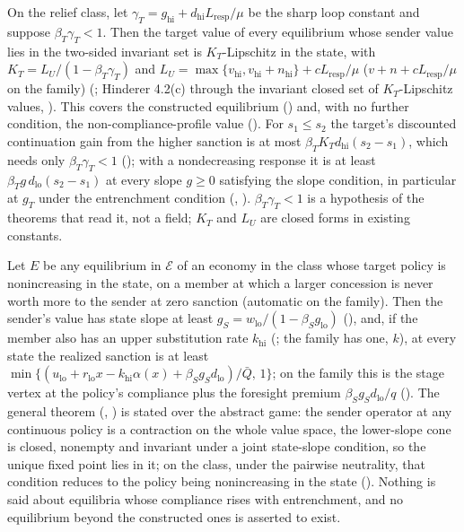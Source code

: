 \begin{proposition}
\label{prop:target-two-sided}
On the relief class, let $\gamma_T=g_{\mathrm{hi}}+d_{\mathrm{hi}}L_{\mathrm{resp}}/\mu$
be the sharp loop constant and suppose $\beta_T\gamma_T<1$. Then the target value
of every equilibrium whose sender value lies in the two-sided invariant set is
$K_T$-Lipschitz in the state, with $K_T=L_U/(1-\beta_T\gamma_T)$ and
$L_U=\max\{v_{\mathrm{hi}},v_{\mathrm{hi}}+n_{\mathrm{hi}}\}+cL_{\mathrm{resp}}/\mu$
($v+n+cL_{\mathrm{resp}}/\mu$ on the family)
(; Hinderer 4.2(c) through the
invariant closed set of $K_T$-Lipschitz values, ).
This covers the constructed equilibrium () and, with no
further condition, the non-compliance-profile value (). For $s_1\le s_2$
the target's discounted continuation gain from the higher sanction is at most
$\beta_TK_Td_{\mathrm{hi}}(s_2-s_1)$, which needs only $\beta_T\gamma_T<1$
(); with a nondecreasing response it is at least
$\beta_Tg\,d_{\mathrm{lo}}(s_2-s_1)$ at every slope $g\ge0$ satisfying the
slope condition, in particular at $g_T$ under the entrenchment condition
(, ).
$\beta_T\gamma_T<1$ is a hypothesis of the theorems that read it, not a field;
$K_T$ and $L_U$ are closed forms in existing constants.
\end{proposition}

\begin{proposition}
\label{prop:certified-equilibria}
Let $E$ be any equilibrium in $\mathcal E$ of an economy in the class whose target
policy is nonincreasing in the state, on a member at which a larger concession
is never worth more to the sender at zero sanction (automatic on the family).
Then the sender's value has state slope
at least $g_S=w_{\mathrm{lo}}/(1-\beta_Sg_{\mathrm{lo}})$ (),
and, if the member also has an upper substitution rate
$k_{\mathrm{hi}}$ (; the family has one, $k$), at every
state the realized sanction is at least
$\min\{(u_{\mathrm{lo}}+r_{\mathrm{lo}}x-k_{\mathrm{hi}}\alpha(x)+\beta_Sg_Sd_{\mathrm{lo}})/\bar Q,\,1\}$;
on the family this is the stage vertex at the policy's compliance plus the
foresight premium $\beta_Sg_Sd_{\mathrm{lo}}/q$
().
The general theorem (,
) is stated over the
abstract game: the sender operator at any continuous policy is a contraction
on the whole value space, the lower-slope cone is closed, nonempty and
invariant under a joint state-slope condition, so the unique fixed point lies in it; on
the class, under the pairwise neutrality, that condition reduces to the policy being
nonincreasing in the state (). Nothing is said about equilibria whose compliance
rises with entrenchment, and no equilibrium beyond the constructed ones is
asserted to exist.
\end{proposition}

